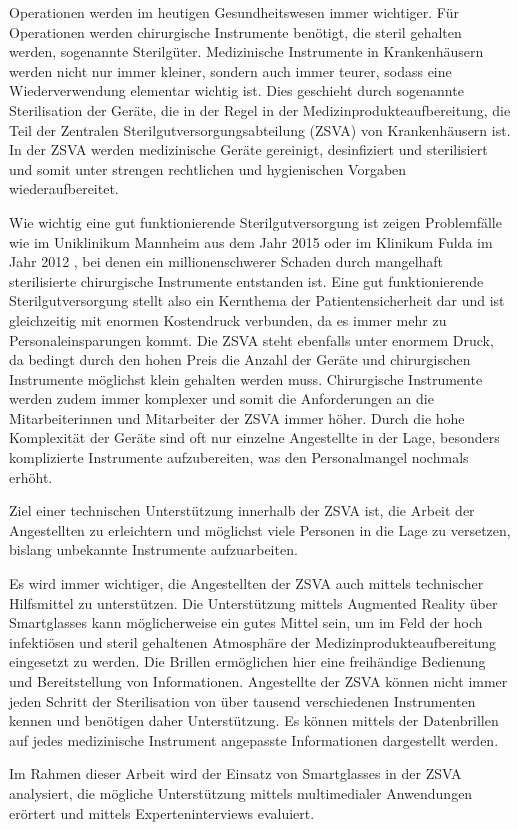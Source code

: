 Operationen werden im heutigen Gesundheitswesen immer wichtiger. Für Operationen werden chirurgische Instrumente benötigt, die steril gehalten werden, sogenannte Sterilgüter.
Medizinische Instrumente in Krankenhäusern werden nicht nur immer kleiner, sondern auch immer teurer, sodass eine Wiederverwendung elementar wichtig ist. Dies geschieht durch sogenannte Sterilisation der Geräte, die in der Regel in der Medizinprodukteaufbereitung, die Teil der Zentralen Sterilgutversorgungsabteilung (ZSVA) von Krankenhäusern ist. In der ZSVA werden medizinische Geräte gereinigt, desinfiziert und sterilisiert und somit unter strengen rechtlichen und hygienischen Vorgaben wiederaufbereitet. 

Wie wichtig eine gut funktionierende Sterilgutversorgung ist zeigen Problemfälle wie im Uniklinikum Mannheim \cite{Brandt2015} aus dem Jahr 2015 oder im Klinikum Fulda im Jahr 2012 \cite{HygieneFuldar2012}, bei denen ein millionenschwerer Schaden durch mangelhaft sterilisierte chirurgische Instrumente entstanden ist. Eine gut funktionierende Sterilgutversorgung stellt also ein Kernthema der Patientensicherheit dar und ist gleichzeitig mit enormen Kostendruck verbunden, da es immer mehr zu Personaleinsparungen kommt. Die ZSVA steht ebenfalls unter enormem Druck, da bedingt durch den hohen Preis die Anzahl der Geräte und chirurgischen Instrumente möglichst klein gehalten werden muss. Chirurgische Instrumente werden zudem immer komplexer und somit die Anforderungen an die Mitarbeiterinnen und Mitarbeiter der ZSVA immer höher. Durch die hohe Komplexität der Geräte sind oft nur einzelne Angestellte in der Lage, besonders komplizierte Instrumente aufzubereiten, was den Personalmangel nochmals erhöht.

Ziel einer technischen Unterstützung innerhalb der ZSVA ist, die Arbeit der Angestellten zu erleichtern und möglichst viele Personen in die Lage zu versetzen, bislang unbekannte Instrumente aufzuarbeiten.

Es wird immer wichtiger, die Angestellten der ZSVA auch mittels technischer Hilfsmittel zu unterstützen. Die Unterstützung mittels Augmented Reality über Smartglasses kann möglicherweise ein gutes Mittel sein, um im Feld der hoch infektiösen und steril gehaltenen Atmosphäre der Medizinprodukteaufbereitung eingesetzt zu werden. Die Brillen ermöglichen hier eine freihändige Bedienung und Bereitstellung von Informationen. Angestellte der ZSVA können nicht immer jeden Schritt der Sterilisation von über tausend verschiedenen Instrumenten kennen und benötigen daher Unterstützung. Es können mittels der Datenbrillen auf jedes medizinische Instrument angepasste Informationen dargestellt werden. 

Im Rahmen dieser Arbeit wird der Einsatz von Smartglasses in der ZSVA analysiert, die mögliche Unterstützung mittels multimedialer Anwendungen erörtert und mittels Experteninterviews evaluiert. 